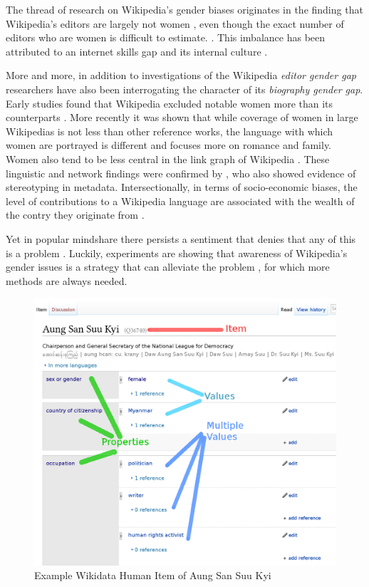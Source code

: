 \documentclass{sig-alternate-05-2015}
\begin{document}
The thread of research on Wikipedia's gender biases originates in the finding that Wikipedia's editors are largely not women \cite{glott2010wikipedia} \cite{lam_wp:clubhouse?:_2011}, even though the exact number of editors who are women is difficult to estimate. \cite{hill_wikipedia_2013}. This imbalance has been attributed to an internet skills gap \cite{hargittai_mind_2015} and its internal culture \cite{lam_wp:clubhouse?:_2011}. 

More and more, in addition to investigations of the Wikipedia \textit{editor gender gap} researchers have also been interrogating the character of its \textit{biography gender gap}. Early studies found that Wikipedia excluded notable women more than its counterparts \cite{reagle_gender_2011}. More recently \cite{wagner_its_2015} it was shown that while coverage of women in large Wiki\-pedias is not less than other reference works, the language with which women are portrayed is different and focuses more on romance and family. Women also tend to be less central in the link graph of Wikipedia \cite{10.1371/journal.pone.0114825}. These linguistic and network findings were confirmed by \cite{graells-garrido_first_2015}, who also showed evidence of stereotyping in metadata. Intersectionally, in terms of socio-economic biases, the level of contributions to a Wikipedia language are associated with the wealth of the contry they originate from \cite{rask_reach_2008}.

Yet in popular mindshare there persists a sentiment that denies that any of this is a problem \cite{eckert_retriggering_2013}. Luckily, experiments are showing that awareness of Wikipedia's gender issues is a strategy that can alleviate the problem \cite{hinnosaar_gender_2015}, for which more methods are always needed.

\begin{figure}
\includegraphics[width=\columnwidth]{figures/aung_explainer_small.png} 
\caption{Example Wikidata Human Item of Aung San Suu Kyi}
\label{fig:aung}
\end{figure}
\end{document}
